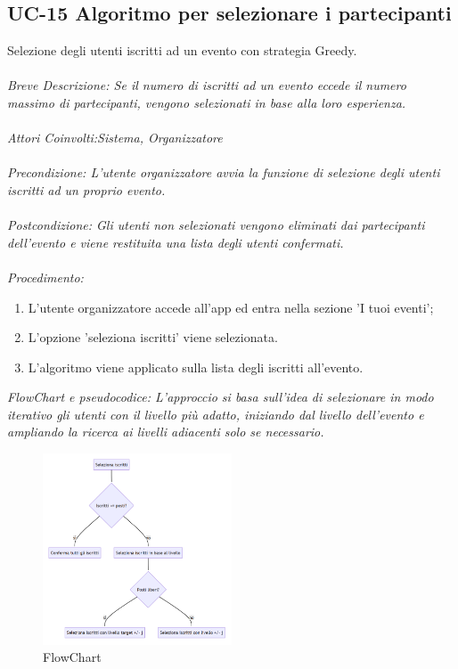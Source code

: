 \subsection{UC-15 Algoritmo per selezionare i partecipanti}
Selezione degli utenti iscritti ad un evento con strategia Greedy.
\\
\\
\textit{Breve Descrizione: Se il numero di iscritti ad un evento eccede il numero massimo di partecipanti, vengono selezionati in base alla loro esperienza.} 
\\
\\
\textit{Attori Coinvolti:Sistema, Organizzatore}
\\
\\
\textit{Precondizione: L'utente organizzatore avvia la funzione di selezione degli utenti iscritti ad un proprio evento.}
\\
\\
\textit{Postcondizione: Gli utenti non selezionati vengono eliminati dai partecipanti dell'evento e viene restituita una lista degli utenti confermati.}
\\
\\
\textit{Procedimento:}
\begin{enumerate}
	\item L'utente organizzatore accede all'app ed entra nella sezione 'I tuoi eventi';
 	\item L'opzione 'seleziona iscritti' viene selezionata.
	\item L'algoritmo viene applicato sulla lista degli iscritti all'evento.
\end{enumerate}
\textit{FlowChart e pseudocodice: L'approccio si basa sull'idea di selezionare in modo iterativo gli utenti con il livello più
adatto, iniziando dal livello dell'evento e ampliando la ricerca ai livelli adiacenti solo se
necessario.}
\\
\begin{figure}[htb]
    \centering
    \includegraphics[width = 0.5\textwidth]{images/flowchart.png}
    \caption{FlowChart}
	\label{fig:FlowChart}
\end{figure}
